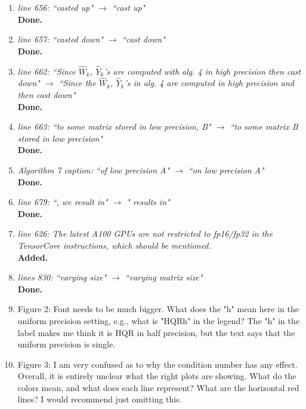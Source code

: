 \documentclass[final,onefignum,onetabnum]{siamart190516}
\begin{document}
\begin{enumerate}
	\item {\it line 656: ``casted up" $\rightarrow$ ``cast up"}\\
	{\bf Done.}
	
	\item {\it line 657: ``casted down" $\rightarrow$ ``cast down"}\\
	{\bf Done.}
	
	\item {\it line 662: ``Since $\hat{W}_k$, $\hat{Y}_k$'s are computed with alg. 4 in high precision then cast down" $\rightarrow$ ``Since the $\hat{W}_k$, $\hat{Y}_k$'s in alg. 4 are computed in high precision and then cast down"}\\
	{\bf Done.}
	
	\item {\it line 663: ``to some matrix stored in low precision, B" $\rightarrow$ ``to some matrix B stored in low precision"}\\
	{\bf Done.}
	
	\item {\it Algorithm 7 caption: ``of low precision A" $\rightarrow$ ``on low precision A"}\\
	{\bf Done.}
	
	\item {\it line 679: ``, we result in" $\rightarrow$ " results in"}\\
	{\bf Done.}
	
	\item {\it line 626: The latest A100 GPUs are not restricted to fp16/fp32 in the TensorCore instructions, which should be mentioned.} \\
	{\bf Added.}
	
	\item {\it lines 830: ``varying size" $\rightarrow$ ``varying matrix size"}\\
	{\bf Done.}
	
	\item Figure 2: Font needs to be much bigger. What does the "h" mean here in the uniform precision setting, e.g., what is "HQRh" in the legend? The "h" in the label makes me think it is HQR in half precision, but the text says that the uniform precision is single. 
	
	
	\item Figure 3: I am very confused as to why the condition number has any effect. Overall, it is entirely unclear what the right plots are showing. What do the colors mean, and what does each line represent? What are the horizontal red lines? I would recommend just omitting this. 
	
\end{enumerate}
\end{document}
